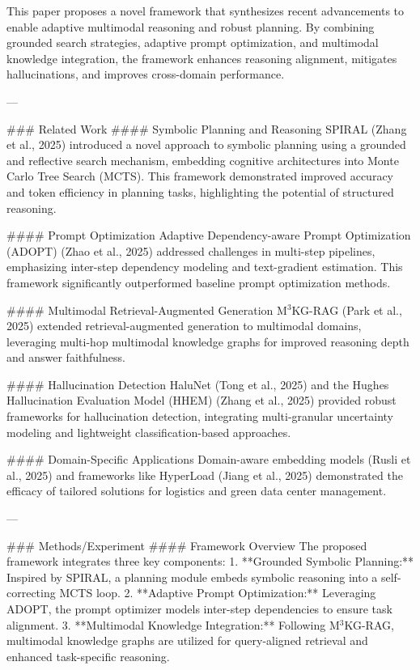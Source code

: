 This paper proposes a novel framework that synthesizes recent advancements to enable adaptive multimodal reasoning and robust planning. By combining grounded search strategies, adaptive prompt optimization, and multimodal knowledge integration, the framework enhances reasoning alignment, mitigates hallucinations, and improves cross-domain performance.

---

### Related Work
#### Symbolic Planning and Reasoning
SPIRAL (Zhang et al., 2025) introduced a novel approach to symbolic planning using a grounded and reflective search mechanism, embedding cognitive architectures into Monte Carlo Tree Search (MCTS). This framework demonstrated improved accuracy and token efficiency in planning tasks, highlighting the potential of structured reasoning.

#### Prompt Optimization
Adaptive Dependency-aware Prompt Optimization (ADOPT) (Zhao et al., 2025) addressed challenges in multi-step pipelines, emphasizing inter-step dependency modeling and text-gradient estimation. This framework significantly outperformed baseline prompt optimization methods.

#### Multimodal Retrieval-Augmented Generation
M$^3$KG-RAG (Park et al., 2025) extended retrieval-augmented generation to multimodal domains, leveraging multi-hop multimodal knowledge graphs for improved reasoning depth and answer faithfulness.

#### Hallucination Detection
HaluNet (Tong et al., 2025) and the Hughes Hallucination Evaluation Model (HHEM) (Zhang et al., 2025) provided robust frameworks for hallucination detection, integrating multi-granular uncertainty modeling and lightweight classification-based approaches.

#### Domain-Specific Applications
Domain-aware embedding models (Rusli et al., 2025) and frameworks like HyperLoad (Jiang et al., 2025) demonstrated the efficacy of tailored solutions for logistics and green data center management.

---

### Methods/Experiment
#### Framework Overview
The proposed framework integrates three key components:
1. **Grounded Symbolic Planning:** Inspired by SPIRAL, a planning module embeds symbolic reasoning into a self-correcting MCTS loop.
2. **Adaptive Prompt Optimization:** Leveraging ADOPT, the prompt optimizer models inter-step dependencies to ensure task alignment.
3. **Multimodal Knowledge Integration:** Following M$^3$KG-RAG, multimodal knowledge graphs are utilized for query-aligned retrieval and enhanced task-specific reasoning.


